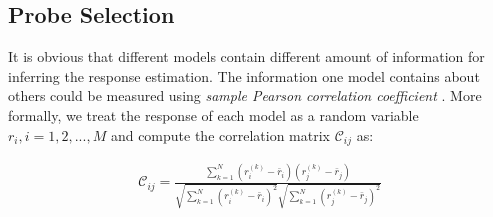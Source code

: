\documentclass{article} %
\begin{document}
\subsection{Probe Selection}
\label{probeselection}
It is obvious that different models contain different amount of information for inferring the response estimation. The information one model contains about others could be measured using \emph{sample Pearson correlation coefficient} \cite{lee1988thirteen}. More formally, we treat the response of each model as a random variable $r_i,i=1,2,...,M$ and compute the correlation matrix $\mathcal{C}_{ij}$ as:

\begin{equation}
\begin{aligned}
\mathcal{C}_{ij}=\frac{\sum_{k=1}^N(r_i^{(k)}-\bar{r}_i)(r_j^{(k)}-\bar{r}_j)}{\sqrt{\sum_{k=1}^N(r_i^{(k)}-\bar{r}_i)^2}\sqrt{\sum_{k=1}^N(r_j^{(k)}-\bar{r}_j)^2}}
\end{aligned}
\label{pearson}
\end{equation}
\end{document}

